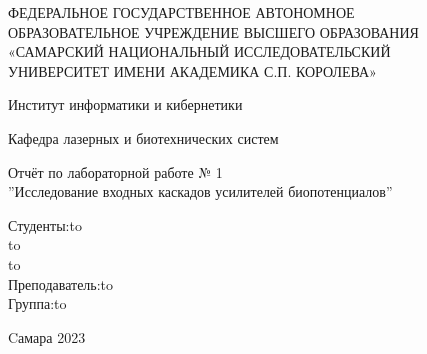 \begin{titlepage}
\newpage
\doublespacing
\begin{center}
ФЕДЕРАЛЬНОЕ ГОСУДАРСТВЕННОЕ АВТОНОМНОЕ\\
ОБРАЗОВАТЕЛЬНОЕ УЧРЕЖДЕНИЕ ВЫСШЕГО ОБРАЗОВАНИЯ\\
«САМАРСКИЙ НАЦИОНАЛЬНЫЙ ИССЛЕДОВАТЕЛЬСКИЙ\\
УНИВЕРСИТЕТ ИМЕНИ АКАДЕМИКА С.П. КОРОЛЕВА»	
 \\
\end{center}

\vspace{5em}

\begin{center}
 Институт информатики и кибернетики \\ 
\end{center}

\begin{center}
Кафедра лазерных и биотехнических систем \\ 
\end{center}


\vspace{3em}

\begin{center}
{Отчёт по лабораторной работе № 1\\''Исследование входных каскадов усилителей биопотенциалов''}
\end{center}

\vspace{11em}



\newbox{\lbox}
\newlength{\maxl}
\setlength{\maxl}{\wd\lbox}
\hfill\parbox{7cm}{
\hspace*{4cm}\hspace*{-4cm}Студенты:\hfill\hbox to\\
\hspace*{4cm}\hspace*{-4cm}\hfill\hbox to\\
\hspace*{4cm}\hspace*{-4cm}\hfill\hbox to\\
\hspace*{4cm}\hspace*{-4cm}Преподаватель:\hfill\hbox to\\
\hspace*{4cm}\hspace*{-4cm}Группа:\hfill\hbox to\\
}

\vspace{\fill}

\begin{center}
Cамара 2023
\end{center}

\end{titlepage}